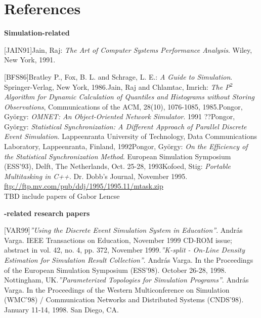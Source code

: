 
\chapter{References}
\label{cha:references}

\textbf{Simulation-related}


[JAIN91]\tab Jain, Raj: \textit{The Art of Computer Systems Performance 
Analysis}. Wiley, New York, 1991.


[BFS86]\tab Bratley P., Fox, B. L. and Schrage, L. E.: \textit{A Guide 
to Simulation}. Springer-Verlag, New York, 1986.\newline
[JCH85]\tab Jain, Raj and Chlamtac, Imrich: \textit{The P}$^{\mathit{2}}$ \textit{Algorithm 
for Dynamic Calculation of Quantiles and Histograms without Storing 
Observations}, Communications of the ACM, 28(10), 1076-1085, 1985.\newline
[PON91]\tab Pongor, Gy\"{o}rgy: \textit{OMNET: An Object-Oriented Network 
Simulator}. 1991 ??\newline
[PON92]\tab Pongor, Gy\"{o}rgy: \textit{Statistical Synchronization: A Different 
Approach of Parallel Discrete Event Simulation}. Lappeenranta 
University of Technology, Data Communications Laboratory, Lappeenranta, 
Finland, 1992\newline
[PON93]\tab Pongor, Gy\"{o}rgy: \textit{On the Efficiency of the Statistical 
Synchronization Method}. European Simulation Symposium (ESS'93), 
Delft, The Netherlands, Oct. 25-28, 1993\newline
[KOF95]\tab Kofoed, Stig: \textit{Portable Multitasking in C++}. Dr. Dobb's 
Journal, November 1995. \href{ftp://ftp.mv.com/pub/ddj/1995/1995.11/mtask.zip}{ftp://ftp.mv.com/pub/ddj/1995/1995.11/mtask.zip}\\
TBD include papers of Gabor Lencse


\textbf{{\opp}-related research papers}


[VAR99]\tab \textit{''Using the {\opp} Discrete Event Simulation 
System in Education''}. Andr\'{a}s Varga. IEEE Transactions 
on Education, November 1999 CD-ROM issue; abstract in vol. 42, 
no. 4, pp. 372, November 1999.\newline
[VAR98a]\tab \textit{''K-split - On-Line Density Estimation for 
Simulation Result Collection''}. Andr\'{a}s Varga. In the 
Proceedings of the European Simulation Symposium (ESS'98). October 
26-28, 1998. Nottingham, UK.\newline
[VAR98b]\tab \textit{''Parameterized Topologies for Simulation Programs''}. 
Andr\'{a}s Varga. In the Proceedings of the Western Multiconference 
on Simulation (WMC'98) / Communication Networks and Distributed 
Systems (CNDS'98). January 11-14, 1998. San Diego, CA.


